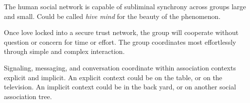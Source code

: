 

The human social network is capable of subliminal synchrony across
groups large and small.  Could be called {\it hive mind} for the
beauty of the phenomenon.

Once love locked into a secure trust network, the group will cooperate
without question or concern for time or effort.  The group coordinates
most effortlessly through simple and complex interaction.  

Signaling, messaging, and conversation coordinate within association
contexts explicit and implicit.  An explicit context could be on the
table, or on the television.  An implicit context could be in the back
yard, or on another social association tree.

\bye
